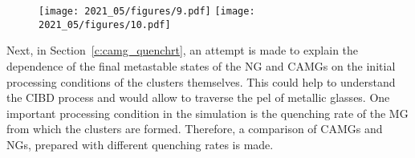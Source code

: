 \begin{selfcite}
\begin{figure}%
	\centering
	\texttt{[image: 2021\_05/figures/9.pdf]}
	\texttt{[image: 2021\_05/figures/10.pdf]}
	\label{f:mro_camg}
\end{figure}

Next, in Section~\ref{c:camg_quenchrt}, an attempt is made to explain the dependence of the final metastable states of the NG and CAMGs on the initial processing conditions of the clusters themselves. This could help to understand the CIBD process and would allow to traverse the \gls{pel} of metallic glasses. One important processing condition in the simulation is the quenching rate of the MG from which the clusters are formed. Therefore, a comparison of CAMGs and NGs, prepared with different quenching rates is made. \par
\end{selfcite}

